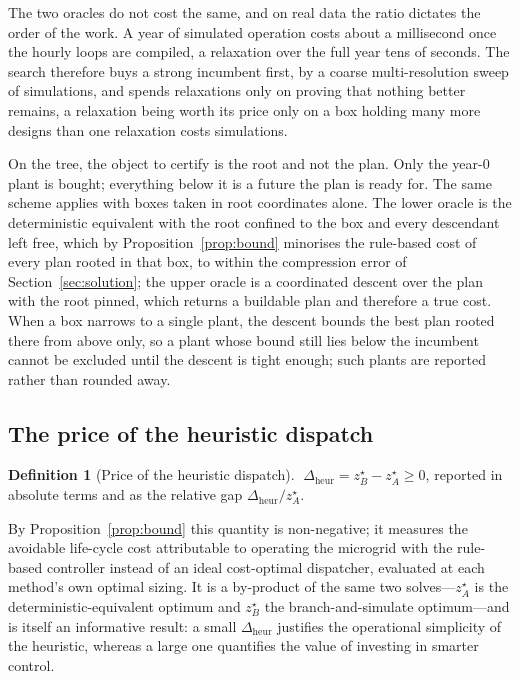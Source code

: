 \documentclass[11pt,a4paper]{article}
\theoremstyle{plain}
\theoremstyle{definition}
\newtheorem{definition}{Definition}
\begin{document}
The two oracles do not cost the same, and on real data the ratio dictates the order of the
work. A year of simulated operation costs about a millisecond once the hourly loops are
compiled, a relaxation over the full year tens of seconds. The search therefore buys a strong
incumbent first, by a coarse multi-resolution sweep of simulations, and spends relaxations
only on proving that nothing better remains, a relaxation being worth its price only on a box
holding many more designs than one relaxation costs simulations.

On the tree, the object to certify is the root and not the plan. Only the year-0 plant is
bought; everything below it is a future the plan is ready for. The same scheme applies with
boxes taken in root coordinates alone. The lower oracle is the deterministic equivalent with
the root confined to the box and every descendant left free, which by
Proposition~\ref{prop:bound} minorises the rule-based cost of every plan rooted in that box,
to within the compression error of Section~\ref{sec:solution}; the upper oracle is a
coordinated descent over the plan with the root pinned, which returns a buildable plan and
therefore a true cost. When a box narrows to a single plant, the descent bounds the best plan
rooted there from above only, so a plant whose bound still lies below the incumbent cannot be
excluded until the descent is tight enough; such plants are reported rather than rounded away.

\subsection{The price of the heuristic dispatch}

\begin{definition}[Price of the heuristic dispatch]
\label{def:price}
$\;\Delta_{\mathrm{heur}} = z_B^\star - z_A^\star \ge 0$, reported in absolute terms and as
the relative gap $\Delta_{\mathrm{heur}}/z_A^\star$.
\end{definition}

By Proposition~\ref{prop:bound} this quantity is non-negative; it measures the avoidable
life-cycle cost attributable to operating the microgrid with the rule-based controller
instead of an ideal cost-optimal dispatcher, evaluated at each method's own optimal
sizing. It is a by-product of the same two solves---$z_A^\star$ is the
deterministic-equivalent optimum and $z_B^\star$ the branch-and-simulate optimum---and is
itself an informative result: a small $\Delta_{\mathrm{heur}}$ justifies the operational
simplicity of the heuristic, whereas a large one quantifies the value of investing in
smarter control.
\end{document}
